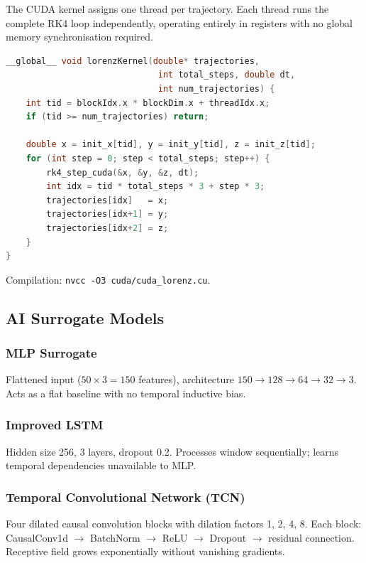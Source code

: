 \documentclass[11pt,a4paper]{article}
\begin{document}
The CUDA kernel assigns one thread per trajectory. Each thread runs the complete RK4
loop independently, operating entirely in registers with no global memory
synchronisation required.

\begin{lstlisting}[language=C,
  caption={CUDA kernel --- \texttt{cuda/cuda\_lorenz.cu}}]
__global__ void lorenzKernel(double* trajectories,
                              int total_steps, double dt,
                              int num_trajectories) {
    int tid = blockIdx.x * blockDim.x + threadIdx.x;
    if (tid >= num_trajectories) return;

    double x = init_x[tid], y = init_y[tid], z = init_z[tid];
    for (int step = 0; step < total_steps; step++) {
        rk4_step_cuda(&x, &y, &z, dt);
        int idx = tid * total_steps * 3 + step * 3;
        trajectories[idx]   = x;
        trajectories[idx+1] = y;
        trajectories[idx+2] = z;
    }
}
\end{lstlisting}

Compilation: \texttt{nvcc -O3 cuda/cuda\_lorenz.cu}.

\subsection{AI Surrogate Models}

\subsubsection{MLP Surrogate}
Flattened input ($50 \times 3 = 150$ features), architecture $150 \to 128 \to 64
\to 32 \to 3$. Acts as a flat baseline with no temporal inductive bias.

\subsubsection{Improved LSTM}
Hidden size 256, 3 layers, dropout 0.2. Processes window sequentially; learns
temporal dependencies unavailable to MLP.

\subsubsection{Temporal Convolutional Network (TCN)}
Four dilated causal convolution blocks with dilation factors 1, 2, 4, 8. Each block:
CausalConv1d $\to$ BatchNorm $\to$ ReLU $\to$ Dropout $\to$ residual connection.
Receptive field grows exponentially without vanishing gradients.
\end{document}
